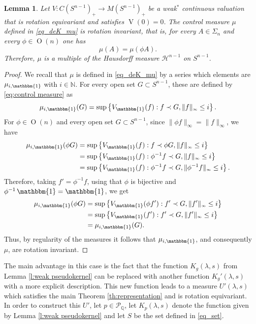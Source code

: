\documentclass[11pt, a4paper]{amsart}
\newtheorem{lemma}[proposition]{Lemma}
\newcommand{\uno}{\operatorname{\mathbbm{1}}}
\newcommand{\sn}{{S^{n-1}}}
\newcommand{\on}{\operatorname{O}(n)}
\newcommand{\oV}{\operatorname{V}}
\newcommand{\poly}{\mathcal P_{\mathbb Q}}
\begin{document}
\begin{lemma}\label{l:invarian_mu}
Let $V\colon C(\sn)_{\scriptscriptstyle +}\to M(\sn)_{\scriptscriptstyle +}$ be a weak$^*$ continuous valuation that is rotation equivariant and satisfies $\oV(0)=0$. The control measure $\mu$ defined in \eqref{eq_deK_mu} is rotation invariant, that is, for every $A\in\Sigma_n$ and every $\phi\in\on$ one has 
\[
    \mu(A)=\mu(\phi A).
\]
Therefore, $\mu$ is a multiple of the Hausdorff measure $\mathcal{H}^{n-1}$ on $\sn$.
\end{lemma}
\begin{proof}
We recall that $\mu$ is defined in \eqref{eq_deK_mu} by a series which elements are $\mu_{i,\uno}$ with $i\in\mathbb{N}$. For every open set $G\subset\sn$, these are defined by \eqref{eq:control measure} as 
\[
    \mu_{i,\uno}(G)=\sup\left\{V_{\uno} (f): f\prec G,\|f\|_{\scriptscriptstyle \infty} \leq i \right\}.
\]
For $\phi\in\on$ and every open set $G\subset \sn$, since  $\|\phi f\|_{\scriptscriptstyle \infty}=\|f\|_{\scriptscriptstyle \infty}$, we have
\begin{align*}
    \mu_{i,\uno}(\phi G)&=\sup\left\{V_{\uno} (f): f\prec \phi G,\|f\|_{\scriptscriptstyle \infty} \leq i \right\}\\&=\sup\left\{V_{\uno} (f): \phi^{-1}f\prec G,\|f\|_{\scriptscriptstyle \infty} \leq i \right\}\\
    &=\sup\left\{V_{\uno} (f): \phi^{-1}f\prec G,\|\phi^{-1}f\|_{\scriptscriptstyle \infty} \leq i \right\}.
\end{align*}
Therefore, taking $f'=\phi^{-1}f$, using that $\phi$ is bijective and $\phi^{-1}\uno=\uno$, we get
\begin{align*}
    \mu_{i,\uno}(\phi G)&=\sup\left\{V_{\uno} (\phi f'): f'\prec G,\|f'\|_{\scriptscriptstyle \infty} \leq i \right\}\\
    &=\sup\left\{V_{\uno} ( f'): f'\prec G,\|f'\|_{\scriptscriptstyle \infty} \leq i \right\}\\
    &=\mu_{i,\uno}(G).
\end{align*}
Thus, by regularity of the measures it follows that $\mu_{i,\uno}$, and consequently $\mu$, are rotation invariant.
\end{proof}

The main advantage in this case is the fact that the function $K_g(\lambda,s)$ from Lemma \ref{l:weak pseudokernel} can be replaced with another function $K_g'(\lambda,s)$ with a more explicit description. This new function leads to a  
measure $U'(\lambda,s)$ which satisfies the main Theorem \ref{th:representation} and is rotation equivariant. In order to construct this $U'$, let $p\in\poly$, let $K_p(\lambda,s)$ denote the function given by Lemma \ref{l:weak pseudokernel} and let $S$ be the set defined in \eqref{eq_set}.
\end{document}

